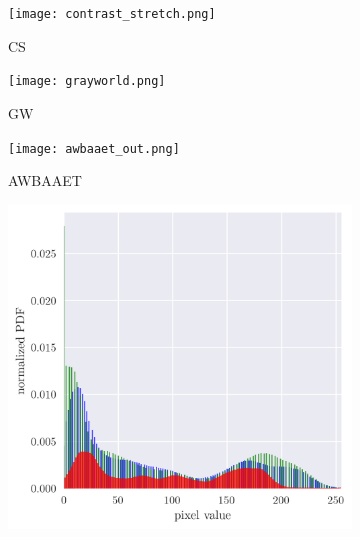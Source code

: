 \documentclass[12pt,a4paper]{article}
\begin{document}
\begin{figure}[htb]
	\centering
	\begin{subfigure}[h!]{0.3\textwidth}
		\centering
		\texttt{[image: contrast\_stretch.png]}
		\caption{CS}
		\label{fig:constretch-com}
	\end{subfigure}
	\begin{subfigure}[h!]{0.3\textwidth}
		\centering
		\texttt{[image: grayworld.png]}
		\caption{GW}
		\label{fig:grayworld-com}
	\end{subfigure}
		\begin{subfigure}[h!]{0.3\textwidth}
		\centering
		\texttt{[image: awbaaet\_out.png]}
		\caption{AWBAAET}
		\label{fig:awbaaet}
	\end{subfigure}
	
	\begin{subfigure}[h!]{0.3\textwidth}
		\centering
		\includegraphics[width=\textwidth]{cs_hist.png}
		\caption{}
		\label{fig:cs-hist-com}
	\end{subfigure}
	\begin{subfigure}[h!]{0.3\textwidth}
		\centering

\end{subfigure}
\end{figure}
\end{document}
